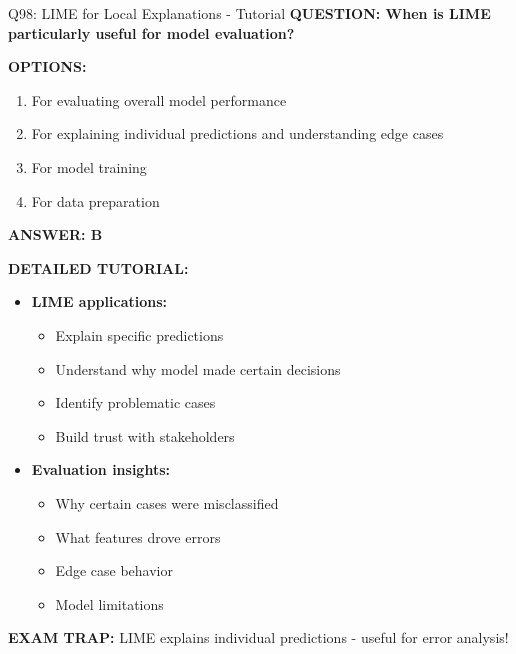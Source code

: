 \documentclass[8pt]{beamer}
\begin{document}
\begin{frame}{Q98: LIME for Local Explanations - Tutorial}
	\fontsize{6.5}{7.5}\selectfont
	\textbf{QUESTION: When is LIME particularly useful for model evaluation?}
	
	\vspace{0.1cm}
	\textbf{OPTIONS:}
	\begin{enumerate}
		\item For evaluating overall model performance
		\item For explaining individual predictions and understanding edge cases
		\item For model training
		\item For data preparation
	\end{enumerate}
	
	\vspace{0.1cm}
	\textcolor{myblue}{\textbf{ANSWER: B}}
	
	\vspace{0.1cm}
	\textbf{DETAILED TUTORIAL:}
	\begin{itemize}
		\item \textbf{LIME applications:}
		\begin{itemize}
			\item Explain specific predictions
			\item Understand why model made certain decisions
			\item Identify problematic cases
			\item Build trust with stakeholders
		\end{itemize}
		\item \textbf{Evaluation insights:}
		\begin{itemize}
			\item Why certain cases were misclassified
			\item What features drove errors
			\item Edge case behavior
			\item Model limitations
		\end{itemize}
	\end{itemize}
	
	\textcolor{myred}{\textbf{EXAM TRAP:}} LIME explains \textcolor{myblue}{individual predictions} - useful for error analysis!
\end{frame}
\end{document}
